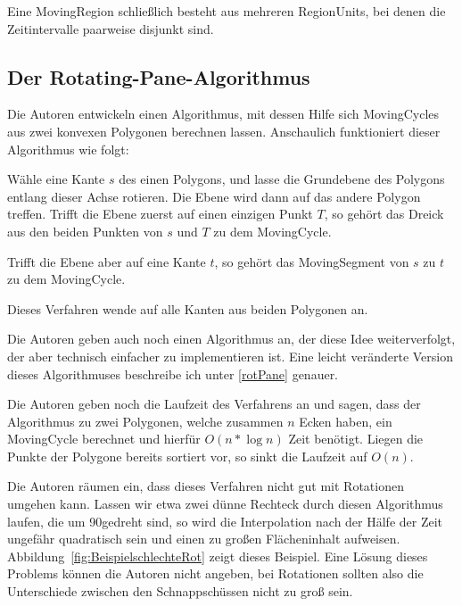 Eine MovingRegion schließlich besteht aus mehreren RegionUnits, bei denen die Zeitintervalle paarweise disjunkt sind.

\subsection{Der Rotating-Pane-Algorithmus}

Die Autoren entwickeln einen Algorithmus, mit dessen Hilfe sich MovingCycles aus zwei konvexen Polygonen berechnen lassen. Anschaulich funktioniert dieser Algorithmus wie folgt:

Wähle eine Kante $s$ des einen Polygons, und lasse die Grundebene des Polygons entlang dieser Achse rotieren. Die Ebene wird dann auf das andere Polygon treffen. Trifft die Ebene zuerst auf einen einzigen Punkt $T$, so gehört das Dreick aus den beiden Punkten von $s$ und $T$ zu dem MovingCycle.

Trifft die Ebene aber auf eine Kante $t$, so gehört das MovingSegment von $s$ zu $t$ zu dem MovingCycle.

Dieses Verfahren wende auf alle Kanten aus beiden Polygonen an.

Die Autoren geben auch noch einen Algorithmus an, der diese Idee weiterverfolgt, der aber technisch einfacher zu implementieren ist. Eine leicht veränderte Version dieses Algorithmuses beschreibe ich unter \ref{rotPane} genauer.

Die Autoren geben noch die Laufzeit des Verfahrens an und sagen, dass der Algorithmus zu zwei Polygonen, welche zusammen $n$ Ecken haben, ein MovingCycle berechnet und hierfür $O(n*\log{n})$ Zeit benötigt. Liegen die Punkte der Polygone bereits sortiert vor, so sinkt die Laufzeit auf $O(n)$.

Die Autoren räumen ein, dass dieses Verfahren nicht gut mit Rotationen umgehen kann. Lassen wir etwa zwei dünne Rechteck durch diesen Algorithmus laufen, die um 90\degree gedreht sind, so wird die Interpolation nach der Hälfe der Zeit ungefähr quadratisch  sein und einen zu großen Flächeninhalt aufweisen. Abbildung~\ref{fig:BeispielschlechteRot} zeigt dieses Beispiel. Eine Lösung dieses Problems können die Autoren nicht angeben, bei Rotationen sollten also die Unterschiede zwischen den Schnappschüssen nicht zu groß sein.

